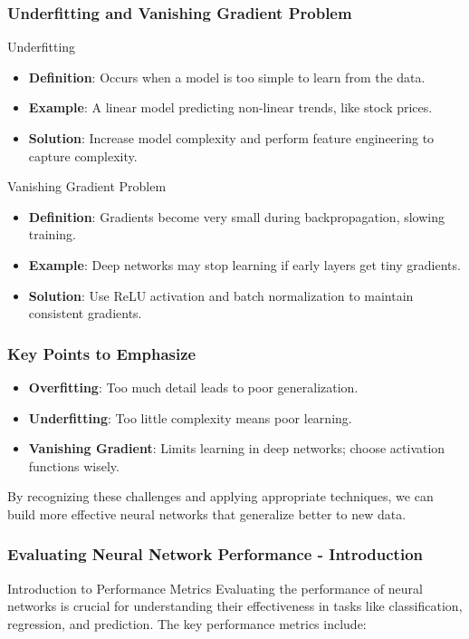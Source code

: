 \documentclass[aspectratio=169]{beamer}
\begin{document}
\begin{frame}[fragile]
    \frametitle{Underfitting and Vanishing Gradient Problem}
    \begin{block}{Underfitting}
        \begin{itemize}
            \item \textbf{Definition}: Occurs when a model is too simple to learn from the data.
            \item \textbf{Example}: A linear model predicting non-linear trends, like stock prices.
            \item \textbf{Solution}: Increase model complexity and perform feature engineering to capture complexity.
        \end{itemize}
    \end{block}

    \begin{block}{Vanishing Gradient Problem}
        \begin{itemize}
            \item \textbf{Definition}: Gradients become very small during backpropagation, slowing training.
            \item \textbf{Example}: Deep networks may stop learning if early layers get tiny gradients.
            \item \textbf{Solution}: Use ReLU activation and batch normalization to maintain consistent gradients.
        \end{itemize}
    \end{block}
\end{frame}

\begin{frame}[fragile]
    \frametitle{Key Points to Emphasize}
    \begin{itemize}
        \item \textbf{Overfitting}: Too much detail leads to poor generalization.
        \item \textbf{Underfitting}: Too little complexity means poor learning.
        \item \textbf{Vanishing Gradient}: Limits learning in deep networks; choose activation functions wisely.
    \end{itemize}

    By recognizing these challenges and applying appropriate techniques, we can build more effective neural networks that generalize better to new data.
\end{frame}

\begin{frame}[fragile]
    \frametitle{Evaluating Neural Network Performance - Introduction}
    \begin{block}{Introduction to Performance Metrics}
        Evaluating the performance of neural networks is crucial for understanding their effectiveness in tasks like classification, regression, and prediction. The key performance metrics include:
    \end{block}
\end{frame}
\end{document}
